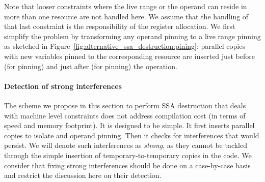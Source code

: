 Note that looser constraints where the live range or the operand can reside in more than one resource are not handled here. 
We assume that the handling of that last constraint is the responsibility of the register allocation. 
We first simplify the problem by transforming any operand pinning to a live range pinning as sketched in Figure~\ref{fig:alternative_ssa_destruction:pining}: 
parallel copies with new variables pinned to the corresponding resource are inserted just before (for \useop pinning) and just after (for  pinning) the operation.




\paragraph{Detection of strong interferences}
\label{par:alternative_ssa_destruction:strong}
The scheme we propose in this section to perform SSA destruction that deals with machine level constraints does not address compilation cost (in terms of speed and memory footprint). 
It is designed to be simple. 
It first inserts parallel copies to isolate \phifuns and operand pinning. 
Then it checks for interferences that would persist. 
We will denote such interferences as \emph{strong}, as they cannot be tackled through the simple insertion of temporary-to-temporary copies in the code. 
We consider that fixing strong interferences should be done on a case-by-case basis and restrict the discussion here on their detection.

